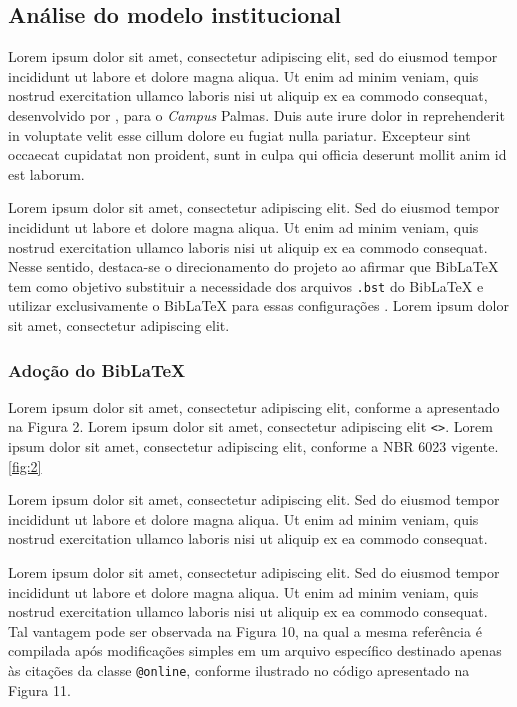 \documentclass[12pt,a4paper]{article}
\begin{document}
\subsection{Análise do modelo institucional}

Lorem ipsum dolor sit amet, consectetur adipiscing elit, sed do eiusmod tempor incididunt ut labore et dolore magna aliqua. Ut enim ad minim veniam, quis nostrud exercitation ullamco laboris nisi ut aliquip ex ea commodo consequat, desenvolvido por \textcite{barbosa2017}, para o \textit{Campus} Palmas. Duis aute irure dolor in reprehenderit in voluptate velit esse cillum dolore eu fugiat nulla pariatur. Excepteur sint occaecat cupidatat non proident, sunt in culpa qui officia deserunt mollit anim id est laborum.

Lorem ipsum dolor sit amet, consectetur adipiscing elit. Sed do eiusmod tempor incididunt ut labore et dolore magna aliqua. Ut enim ad minim veniam, quis nostrud exercitation ullamco laboris nisi ut aliquip ex ea commodo consequat. Nesse sentido, destaca-se o direcionamento do projeto ao afirmar que BibLaTeX tem como objetivo substituir a necessidade dos arquivos \verb|.bst| do BibLaTeX e utilizar exclusivamente o BibLaTeX para essas configurações \cite{abntex26}. Lorem ipsum dolor sit amet, consectetur adipiscing elit.

\subsubsection{Adoção do BibLaTeX}

Lorem ipsum dolor sit amet, consectetur adipiscing elit, conforme a apresentado na Figura 2. Lorem ipsum dolor sit amet, consectetur adipiscing elit \verb|<|\verb|>|. Lorem ipsum dolor sit amet, consectetur adipiscing elit, conforme a NBR 6023 vigente. \ref{fig:2}


Lorem ipsum dolor sit amet, consectetur adipiscing elit. Sed do eiusmod tempor incididunt ut labore et dolore magna aliqua. Ut enim ad minim veniam, quis nostrud exercitation ullamco laboris nisi ut aliquip ex ea commodo consequat.

Lorem ipsum dolor sit amet, consectetur adipiscing elit. Sed do eiusmod tempor incididunt ut labore et dolore magna aliqua. Ut enim ad minim veniam, quis nostrud exercitation ullamco laboris nisi ut aliquip ex ea commodo consequat. Tal vantagem pode ser observada na Figura 10, na qual a mesma referência é compilada após modificações simples em um arquivo específico destinado apenas às citações da classe \verb|@online|, conforme ilustrado no código apresentado na Figura 11.
\end{document}
